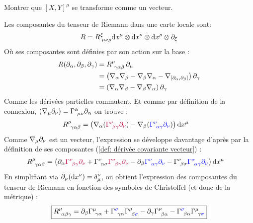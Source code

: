 \begin{exerc}
    Montrer que $[X, Y]^{\mu}$ se transforme comme un vecteur.
\end{exerc}
Les composantes du tenseur de Riemann dans une carte locale sont:
\begin{align}
    R = R\indices{^{\xi}_{\!\mu \nu \rho}}\td x^{\mu}\otimes \td x^{\nu}\otimes \td x^{\rho}\otimes \partial_{\xi}
\end{align}
Où ses composantes sont définies par son action sur la base :
\begin{align}
     R(\partial_{\alpha}, \partial_{\beta},\partial_{\gamma}) &= R\indices{^{\mu}_{\!\gamma \alpha \beta}} \,\pd_\mu\\
     & =\lt \nabla_{\alpha} \nabla_{\beta}  - \nabla_{\beta}\nabla_{\alpha} - \nabla_{[\partial_{\alpha}, \partial_{\beta}]}\rt\partial_{\gamma}\\
     & = \lt \nabla_{\alpha} \nabla_{\beta}  - \nabla_{\beta}\nabla_{\alpha}\rt\partial_{\gamma}
\end{align}
Comme les dérivées partielles commutent. Et comme par définition de la connexion, $(\nabla_\mu \partial_\nu) = \Gamma\indices{^\alpha_{\!\mu\nu}} \pd_\alpha$ on trouve :
\begin{align}
     R\indices{^{\mu}_{\!\gamma\alpha \beta}} &=\lt \nabla_{{\alpha}}(\textcolor{purple}{\Gamma\indices{^{\nu}_{\!\beta \gamma}}\partial_{\nu}}) - \nabla_{{\beta}}(\textcolor{blue}{\Gamma\indices{^{\nu}_{\!\alpha \gamma}}\partial_{\nu}}) \rt \td x^{\mu}
\end{align}
Comme $\nabla_\mu \partial_\nu$ est un vecteur, l'expression se développe davantage d'après par la définition de ses composantes (\ref{def: dérivée covariante vecteur}) :
\begin{align}
     R\indices{^{\mu}_{\!\gamma\alpha \beta}} &=\lt \partial_{\alpha}\textcolor{purple}{\Gamma\indices{^{\nu}_{\!\beta \gamma}}\partial_{\nu}} + \Gamma\indices{^{\nu}_{\!\alpha \sigma}}\textcolor{purple}{\Gamma\indices{^{\sigma}_{\!\beta \gamma}}} \textcolor{purple}{\partial_{\nu}} - \partial_{\beta}\textcolor{blue}{\Gamma\indices{^{\nu}_{\!\alpha \gamma}}\partial_{\nu}} - \Gamma\indices{^{\nu}_{\!\beta \sigma}}\textcolor{blue}{\Gamma\indices{^{\sigma}_{\!\alpha \gamma}}} \textcolor{blue}{\partial_{\nu}} \rt \td x^{\mu}
\end{align}
En simplifiant via $\partial_\mu (\mathrm{d} x^\nu) = \delta^\nu_\mu$, on obtient l'expression des composantes du tenseur de Riemann en fonction des symboles de Christoffel (et donc de la métrique) :
\begin{align}
     \label{Composantes du tenseur de Riemann}
    \boxed{R\indices{^{\mu}_{\!\alpha \beta \gamma}} =  \partial_{\beta}\Gamma\indices{^{\mu}_{\!\gamma \alpha}} + \Gamma\indices{^{\blue{\sigma}}_{\!\gamma \alpha}} \Gamma\indices{^{\mu}_{\!\beta \blue{\sigma}}} - \partial_{\gamma}\Gamma\indices{^{\mu}_{\!\beta \alpha}} - \Gamma\indices{^{\blue{\sigma}}_{\!\beta \alpha}} \Gamma\indices{^{\mu}_{\!\gamma \blue{\sigma}}} }
\end{align}
